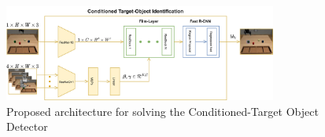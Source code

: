 \begin{figure}[htb]
    \centering
    \includegraphics[width=0.8\textwidth]{Figures/images/ctod/ctod.png}
    \caption{Proposed architecture for solving the Conditioned-Target Object Detector}
    \label{fig:ctod}
\end{figure}
